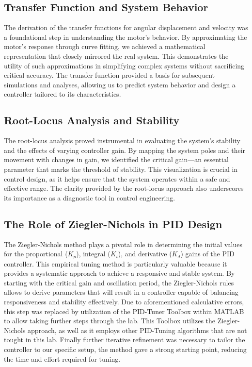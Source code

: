 \subsection{Transfer Function and System Behavior}

The derivation of the transfer functions for angular displacement and velocity was a foundational step in 
understanding the motor's behavior. By approximating the motor's response through curve fitting, we achieved a 
mathematical representation that closely mirrored the real system. This demonstrates the utility of such 
approximations in simplifying complex systems without sacrificing critical accuracy. The transfer function 
provided a basis for subsequent simulations and analyses, allowing us to predict system behavior and design a 
controller tailored to its characteristics.

\subsection{Root-Locus Analysis and Stability}

The root-locus analysis proved instrumental in evaluating the system’s stability and the effects of varying 
controller gain. By mapping the system poles and their movement with changes in gain, we identified the critical 
gain—an essential parameter that marks the threshold of stability. This visualization is crucial in control 
design, as it helps ensure that the system operates within a safe and effective range. The clarity provided by 
the root-locus approach also underscores its importance as a diagnostic tool in control engineering.

\subsection{The Role of Ziegler-Nichols in PID Design}

The Ziegler-Nichols method plays a pivotal role in determining the initial values for the proportional ($K_p$), 
integral ($K_i$), and derivative ($K_d$) gains of the PID controller. This empirical tuning method is particularly 
valuable because it provides a systematic approach to achieve a responsive and stable system. By starting with the 
critical gain and oscillation period, the Ziegler-Nichols rules allows to derive parameters that will result in a 
controller capable of balancing responsiveness and stability effectively. Due to aforementioned calculative errors,
this step was replaced by utilization of the PID-Tuner Toolbox within MATLAB to allow taking further steps through 
the lab. This Toolbox utilizes the Ziegler-Nichols approach, as well as it employs other PID-Tuning algorithms 
that are not tought in this lab. Finally further iterative refinement was necessary to tailor the controller to 
our specific setup, the method gave a strong starting point, reducing the time and effort required for tuning.

